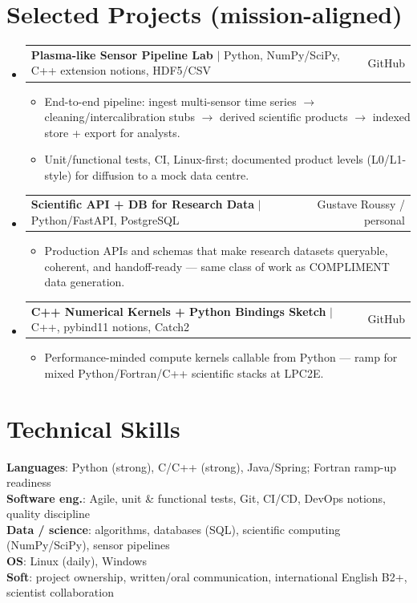 \documentclass[letterpaper,10.5pt]{article}
\makeatletter
\newcommand{\resumeItem}[1]{\item\small{#1 \vspace{-1.5pt}}}
\newcommand{\resumeProjectHeading}[2]{
    \item
    \begin{tabular*}{0.97\textwidth}{l@{\extracolsep{\fill}}r}
      \small#1 & #2 \\
    \end{tabular*}\vspace{-5pt}
}
\newcommand{\resumeSubHeadingListStart}{\begin{itemize}[leftmargin=0.15in, label={}]}
\newcommand{\resumeSubHeadingListEnd}{\end{itemize}}
\newcommand{\resumeItemListStart}{\begin{itemize}[leftmargin=0.18in]}
\newcommand{\resumeItemListEnd}{\end{itemize}\vspace{-3pt}}
\makeatother
\begin{document}
\section{Selected Projects (mission-aligned)}

\resumeSubHeadingListStart

  \resumeProjectHeading
    {\textbf{Plasma-like Sensor Pipeline Lab} $|$ Python, NumPy/SciPy, C++ extension notions, HDF5/CSV}{GitHub}
    \resumeItemListStart
      \resumeItem{End-to-end pipeline: ingest multi-sensor time series $\rightarrow$ cleaning/intercalibration stubs $\rightarrow$ derived scientific products $\rightarrow$ indexed store + export for analysts.}
      \resumeItem{Unit/functional tests, CI, Linux-first; documented product levels (L0/L1-style) for diffusion to a mock data centre.}
    \resumeItemListEnd
  \resumeProjectHeading
    {\textbf{Scientific API + DB for Research Data} $|$ Python/FastAPI, PostgreSQL}{Gustave Roussy / personal}
    \resumeItemListStart
      \resumeItem{Production APIs and schemas that make research datasets queryable, coherent, and handoff-ready --- same class of work as COMPLIMENT data generation.}
    \resumeItemListEnd
  \resumeProjectHeading
    {\textbf{C++ Numerical Kernels + Python Bindings Sketch} $|$ C++, pybind11 notions, Catch2}{GitHub}
    \resumeItemListStart
      \resumeItem{Performance-minded compute kernels callable from Python --- ramp for mixed Python/Fortran/C++ scientific stacks at LPC2E.}
    \resumeItemListEnd
\resumeSubHeadingListEnd

\section{Technical Skills}

\begin{itemize}[leftmargin=0.15in, label={}]
  \small{\item{
\textbf{Languages}: Python (strong), C/C++ (strong), Java/Spring; Fortran ramp-up readiness \\
\textbf{Software eng.}: Agile, unit \& functional tests, Git, CI/CD, DevOps notions, quality discipline \\
\textbf{Data / science}: algorithms, databases (SQL), scientific computing (NumPy/SciPy), sensor pipelines \\
\textbf{OS}: Linux (daily), Windows \\
\textbf{Soft}: project ownership, written/oral communication, international English B2+, scientist collaboration
  }}
\end{itemize}
\end{document}
